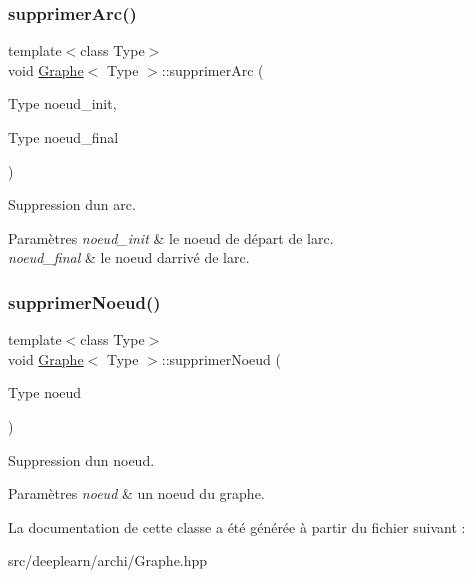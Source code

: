 \subsubsection{\texorpdfstring{supprimer\+Arc()}{supprimerArc()}}
{\footnotesize\ttfamily template$<$class Type$>$ \\
void \hyperlink{class_graphe}{Graphe}$<$ Type $>$\+::supprimer\+Arc (\begin{DoxyParamCaption}\item[{Type}]{noeud\+\_\+init,  }\item[{Type}]{noeud\+\_\+final }\end{DoxyParamCaption})}



Suppression d\textquotesingle{}un arc. 


\begin{DoxyParams}{Paramètres}
{\em noeud\+\_\+init} & le noeud de départ de l\textquotesingle{}arc. \\
\hline
{\em noeud\+\_\+final} & le noeud d\textquotesingle{}arrivé de l\textquotesingle{}arc. \\
\hline
\end{DoxyParams}
\mbox{\label{class_graphe_a5887c7cd72bcf4b5f8c169a22b5180f1}} 
\subsubsection{\texorpdfstring{supprimer\+Noeud()}{supprimerNoeud()}}
{\footnotesize\ttfamily template$<$class Type$>$ \\
void \hyperlink{class_graphe}{Graphe}$<$ Type $>$\+::supprimer\+Noeud (\begin{DoxyParamCaption}\item[{Type}]{noeud }\end{DoxyParamCaption})}



Suppression d\textquotesingle{}un noeud. 


\begin{DoxyParams}{Paramètres}
{\em noeud} & un noeud du graphe. \\
\hline
\end{DoxyParams}


La documentation de cette classe a été générée à partir du fichier suivant \+:\begin{DoxyCompactItemize}
\item 
src/deeplearn/archi/Graphe.\+hpp\end{DoxyCompactItemize}
